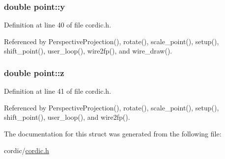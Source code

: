 \subsubsection[{\texorpdfstring{y}{y}}]{\setlength{\rightskip}{0pt plus 5cm}double point\+::y}\hypertarget{structpoint_a613f8f0d7352731638b0094e1b958b87}{}\label{structpoint_a613f8f0d7352731638b0094e1b958b87}


Definition at line 40 of file cordic.\+h.



Referenced by Perspective\+Projection(), rotate(), scale\+\_\+point(), setup(), shift\+\_\+point(), user\+\_\+loop(), wire2fp(), and wire\+\_\+draw().

\subsubsection[{\texorpdfstring{z}{z}}]{\setlength{\rightskip}{0pt plus 5cm}double point\+::z}\hypertarget{structpoint_aab1f0c3682401083b5bf252e7001874f}{}\label{structpoint_aab1f0c3682401083b5bf252e7001874f}


Definition at line 41 of file cordic.\+h.



Referenced by Perspective\+Projection(), rotate(), scale\+\_\+point(), setup(), shift\+\_\+point(), user\+\_\+loop(), and wire2fp().



The documentation for this struct was generated from the following file\+:\begin{DoxyCompactItemize}
\item 
cordic/\hyperlink{cordic_8h}{cordic.\+h}\end{DoxyCompactItemize}
